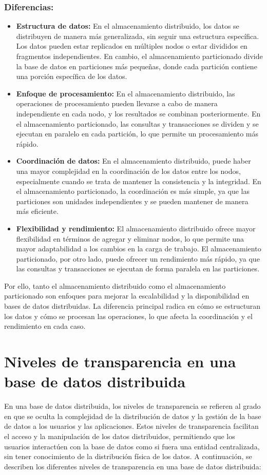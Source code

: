 \subsubsection{Diferencias:}
\noindent
\begin{itemize}
	\item \textbf{Estructura de datos:} En el almacenamiento distribuido, los datos se distribuyen de manera más generalizada, sin seguir una estructura específica. Los datos pueden estar replicados en múltiples nodos o estar divididos en fragmentos independientes. En cambio, el almacenamiento particionado divide la base de datos en particiones más pequeñas, donde cada partición contiene una porción específica de los datos.
	\item \textbf{Enfoque de procesamiento:} En el almacenamiento distribuido, las operaciones de procesamiento pueden llevarse a cabo de manera independiente en cada nodo, y los resultados se combinan posteriormente. En el almacenamiento particionado, las consultas y transacciones se dividen y se ejecutan en paralelo en cada partición, lo que permite un procesamiento más rápido.
	\item \textbf{Coordinación de datos:} En el almacenamiento distribuido, puede haber una mayor complejidad en la coordinación de los datos entre los nodos, especialmente cuando se trata de mantener la consistencia y la integridad. En el almacenamiento particionado, la coordinación es más simple, ya que las particiones son unidades independientes y se pueden mantener de manera más eficiente.
	\item \textbf{Flexibilidad y rendimiento:} El almacenamiento distribuido ofrece mayor flexibilidad en términos de agregar y eliminar nodos, lo que permite una mayor adaptabilidad a los cambios en la carga de trabajo. El almacenamiento particionado, por otro lado, puede ofrecer un rendimiento más rápido, ya que las consultas y transacciones se ejecutan de forma paralela en las particiones.
\end{itemize}

Por ello, tanto el almacenamiento distribuido como el almacenamiento particionado son enfoques para mejorar la escalabilidad y la disponibilidad en bases de datos distribuidas. La diferencia principal radica en cómo se estructuran los datos y cómo se procesan las operaciones, lo que afecta la coordinación y el rendimiento en cada caso.

\section{Niveles de transparencia en una base de datos distribuida}
\noindent
En una base de datos distribuida, los niveles de transparencia se refieren al grado en que se oculta la complejidad de la distribución de datos y la gestión de la base de datos a los usuarios y las aplicaciones. Estos niveles de transparencia facilitan el acceso y la manipulación de los datos distribuidos, permitiendo que los usuarios interactúen con la base de datos como si fuera una entidad centralizada, sin tener conocimiento de la distribución física de los datos. A continuación, se describen los diferentes niveles de transparencia en una base de datos distribuida:

